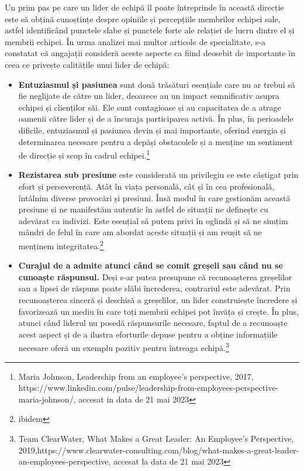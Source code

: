\documentclass[a4paper, 12pt]{article}
\begin{document}
	\quad\quad Un prim pas pe care un lider de echipă îl poate întreprinde în această direcție este să obțină cunoștințe despre opiniile și percepțiile membrilor echipei sale, astfel identificând punctele slabe și punctele forte ale relației de lucru dintre el și membrii echipei. În urma analizei mai multor articole de specialitate, s-a constatat că angajații consideră aceste aspecte ca fiind deosebit de importante în ceea ce privește calitățile unui lider de echipă:
	\begin{itemize}

	\item \textbf {Entuziasmul și pasiunea}  sunt două trăsături esențiale care nu ar trebui să fie neglijate de către un lider, deoarece au un impact semnificativ asupra echipei și clienților săi. Ele sunt contagioase și au capacitatea de a atrage oamenii către lider și de a încuraja participarea activă. În plus, în perioadele dificile, entuziasmul și pasiunea devin și mai importante, oferind energia și determinarea necesare pentru a depăși obstacolele și a menține un sentiment de direcție și scop în cadrul echipei.\footnote{Maria Johnson, Leadership from an employee's perspective, 2017,  https://www.linkedin.com/pulse/leadership-from-employees-perspective-maria-johnson/, accesat in data de 21 mai 2023}
	\item\textbf{Rezistarea sub presiune} este considerată un privilegiu ce este câștigat prin efort și perseverență. Atât în viața personală, cât și în cea profesională, întâlnim diverse provocări și presiuni. Însă modul în care gestionăm această presiune și ne manifestăm autentic în astfel de situații ne definește cu adevărat ca indivizi. Este esențial să putem privi în oglindă și să ne simțim mândri de felul în care am abordat aceste situații și am reușit să ne menținem integritatea.\footnote{ibidem}

	\item \textbf{Curajul de a admite atunci când se comit greșeli sau când nu se cunoaște răspunsul.} Deși s-ar putea presupune că recunoașterea greșelilor sau a lipsei de răspuns poate slăbi încrederea, contrariul este adevărat. Prin recunoașterea sinceră și deschisă a greșelilor, un lider construiește încredere și favorizează un mediu în care toți membrii echipei pot învăța și crește. În plus, atunci când liderul nu posedă răspunsurile necesare, faptul de a recunoaște acest aspect și de a ilustra eforturile depuse pentru a obține informațiile necesare oferă un exemplu pozitiv pentru întreaga echipă.\footnote{Team ClearWater, What Makes a Great Leader: An Employee's Perspective, 2019,https://www.clearwater-consulting.com/blog/what-makes-a-great-leader-an-employees-perspective, accesat la data de 21 mai 2023}


\end{itemize}
\end{document}

